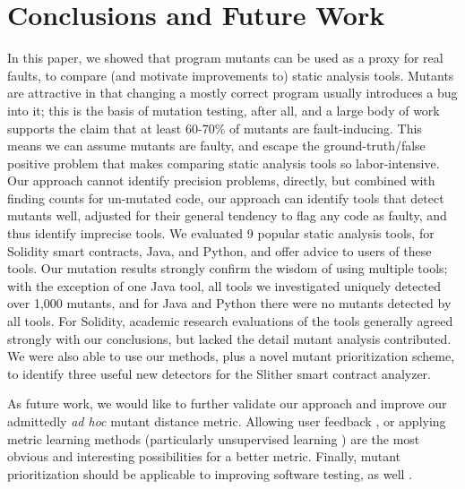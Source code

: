 \section{Conclusions and Future Work}

In this paper, we showed that program mutants can be used as a proxy
for real faults, to compare (and motivate improvements to) static
analysis tools.  Mutants are attractive in that changing a mostly
correct program usually introduces a bug into it; this is the basis of
mutation testing, after all, and a large body of work supports the
claim that at least 60-70\% of mutants are fault-inducing.   This
means we can assume mutants are faulty, and escape the
ground-truth/false positive problem that makes comparing static
analysis tools so labor-intensive.  Our approach cannot identify precision
problems, directly, but combined with finding counts for un-mutated
code, our approach can identify tools that detect mutants well,
adjusted for their general tendency to flag any code as faulty, and
thus identify imprecise tools.  We
evaluated 9 popular static analysis tools, for Solidity smart contracts, Java,
and Python, and offer advice to users of these tools.  Our mutation
results strongly confirm the wisdom of using multiple tools; with the
exception of one Java tool, all tools we investigated uniquely
detected over 1,000 mutants, and for Java and Python there were no
mutants detected by all tools. For Solidity,
academic research evaluations of the tools generally agreed strongly
with our conclusions, but lacked the detail mutant analysis contributed.
We were also able to use our methods, plus a novel mutant prioritization scheme, to
identify three useful new detectors for the Slither smart contract
analyzer.

As future work, we would like to further validate our approach and
improve our admittedly \emph{ad hoc} mutant distance metric.  Allowing
user feedback \cite{EndUserMistake,OnlyOracle}, or applying metric
learning methods \cite{kulis2012metric} (particularly unsupervised
learning \cite{scholkopf1998nonlinear,tipping1999probabilistic}) are
the most obvious and interesting possibilities for a better metric.
Finally, mutant prioritization should be applicable to improving
software testing, as well \cite{groce2018verified}.